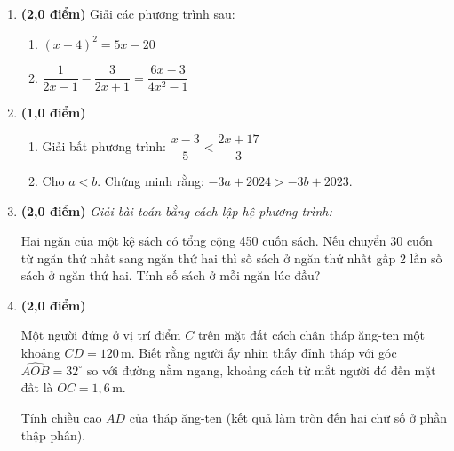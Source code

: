\documentclass[12pt,a4paper]{article}
\begin{document}
\begin{enumerate}[label=\textbf{Câu \arabic*.}, leftmargin=*, itemsep=6pt, parsep=0pt, start=9]
  \item \textbf{(2,0 điểm)} Giải các phương trình sau:
  \begin{enumerate}[label=\arabic*), leftmargin=20pt, itemsep=3pt]
    \item $(x - 4)^2 = 5x - 20$
    \item $\dfrac{1}{2x - 1} - \dfrac{3}{2x + 1} = \dfrac{6x - 3}{4x^2 - 1}$
  \end{enumerate}

  \item \textbf{(1,0 điểm)}
  \begin{enumerate}[label=\arabic*), leftmargin=20pt, itemsep=3pt]
    \item Giải bất phương trình: $\dfrac{x - 3}{5} < \dfrac{2x + 17}{3}$
    \item Cho $a < b$. Chứng minh rằng: $-3a + 2024 > -3b + 2023$.
  \end{enumerate}

  \item \textbf{(2,0 điểm)} \textit{Giải bài toán bằng cách lập hệ phương trình:}
  
  Hai ngăn của một kệ sách có tổng cộng 450 cuốn sách. Nếu chuyển 30 cuốn từ ngăn thứ nhất sang ngăn thứ hai thì số sách ở ngăn thứ nhất gấp 2 lần số sách ở ngăn thứ hai. Tính số sách ở mỗi ngăn lúc đầu?

  \item \textbf{(2,0 điểm)} 
  \par\noindent
  \begin{minipage}[t]{0.64\linewidth}
    Một người đứng ở vị trí điểm $C$ trên mặt đất cách chân tháp ăng-ten một khoảng $CD = 120\,\text{m}$. Biết rằng người ấy nhìn thấy đỉnh tháp với góc $\widehat{AOB} = 32^\circ$ so với đường nằm ngang, khoảng cách từ mắt người đó đến mặt đất là $OC = 1{,}6\,\text{m}$.
    
    Tính chiều cao $AD$ của tháp ăng-ten (kết quả làm tròn đến hai chữ số ở phần thập phân).
  \end{minipage}\hfill
  \begin{minipage}[t]{0.34\linewidth}
    \vspace{-3mm}
    \begin{center}
\end{center}
\end{minipage}
\end{enumerate}
\end{document}
